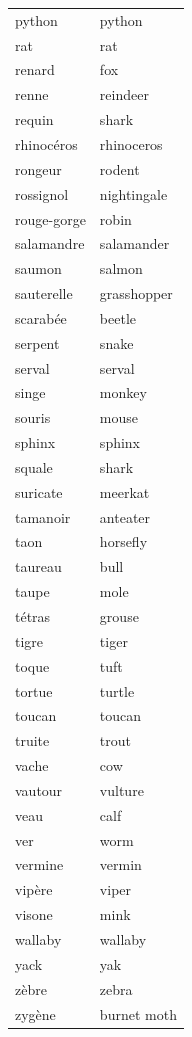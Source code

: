 \documentclass[12pt,a4paper]{article}
\begin{document}
\begin{longtable}{p{4cm} p{6cm}}
python & python \\
rat & rat \\
renard & fox \\
renne & reindeer \\
requin & shark \\
rhinocéros & rhinoceros \\
rongeur & rodent \\
rossignol & nightingale \\
rouge-gorge & robin \\
salamandre & salamander \\
saumon & salmon \\
sauterelle & grasshopper \\
scarabée & beetle \\
serpent & snake \\
serval & serval \\
singe & monkey \\
souris & mouse \\
sphinx & sphinx \\
squale & shark \\
suricate & meerkat \\
tamanoir & anteater \\
taon & horsefly \\
taureau & bull \\
taupe & mole \\
tétras & grouse \\
tigre & tiger \\
toque & tuft \\
tortue & turtle \\
toucan & toucan \\
truite & trout \\
vache & cow \\
vautour & vulture \\
veau & calf \\
ver & worm \\
vermine & vermin \\
vipère & viper \\
visone & mink \\
wallaby & wallaby \\
yack & yak \\
zèbre & zebra \\
zygène & burnet moth \\
\bottomrule
\end{longtable}

\newpage
\end{document}
